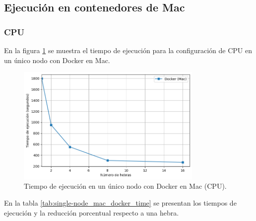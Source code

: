 

\subsection{Ejecución en contenedores de Mac}
\subsubsection{CPU}

En la figura \ref{fig:single-node_mac_docker_time} se muestra el tiempo de ejecución para la configuración de CPU en un único nodo con Docker en Mac.

\begin{figure}[H]
    \centering
    \includegraphics[width=0.8\textwidth]{imagenes/cap5/single-node_mac_docker_time.png}
    \caption{Tiempo de ejecución en un único nodo con Docker en Mac (CPU).}
    \label{fig:single-node_mac_docker_time}
\end{figure}

En la tabla \ref{tab:single-node_mac_docker_time} se presentan los tiempos de ejecución y la reducción porcentual respecto a una hebra.

